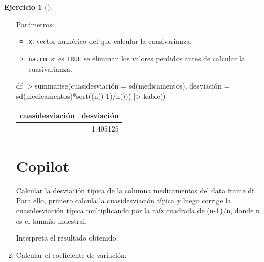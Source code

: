 \documentclass[
  a4paper,
]{scrreport}
\newenvironment{Shaded}{\begin{snugshade}}{\end{snugshade}}
\newcommand{\DecValTok}[1]{\textcolor[rgb]{0.68,0.00,0.00}{#1}}
\newcommand{\ErrorTok}[1]{\textcolor[rgb]{0.68,0.00,0.00}{#1}}
\newcommand{\ExtensionTok}[1]{\textcolor[rgb]{0.00,0.23,0.31}{#1}}
\newcommand{\FunctionTok}[1]{\textcolor[rgb]{0.28,0.35,0.67}{#1}}
\newcommand{\KeywordTok}[1]{\textcolor[rgb]{0.00,0.23,0.31}{\textbf{#1}}}
\newcommand{\NormalTok}[1]{\textcolor[rgb]{0.00,0.23,0.31}{#1}}
\newcommand{\OtherTok}[1]{\textcolor[rgb]{0.00,0.23,0.31}{#1}}
\newcommand{\SpecialCharTok}[1]{\textcolor[rgb]{0.37,0.37,0.37}{#1}}
\providecommand{\tightlist}{%
  \setlength{\itemsep}{0pt}\setlength{\parskip}{0pt}}\usepackage{longtable,booktabs,array}
\theoremstyle{definition}
\newtheorem{exercise}{Ejercicio}[chapter]
\theoremstyle{remark}
\begin{document}
\begin{exercise}[]
\begin{enumerate}
\begin{tcolorbox}
  Parámetros:

  \begin{itemize}
  \tightlist
  \item
    \texttt{x}: vector numérico del que calcular la cuasivarianza.
  \item
    \texttt{na.rm}: si es \texttt{TRUE} se eliminan los valores perdidos
    antes de calcular la cuasivarianza.
  \end{itemize}

\begin{Shaded}
\begin{Highlighting}[]
\NormalTok{df }\SpecialCharTok{|\textgreater{}} \FunctionTok{summarise}\NormalTok{(cuasidesviación }\OtherTok{=} \FunctionTok{sd}\NormalTok{(medicamentos), }
\NormalTok{    desviación }\OtherTok{=} \FunctionTok{sd}\NormalTok{(medicamentos)}\SpecialCharTok{*}\FunctionTok{sqrt}\NormalTok{((}\FunctionTok{n}\NormalTok{()}\SpecialCharTok{{-}}\DecValTok{1}\NormalTok{)}\SpecialCharTok{/}\FunctionTok{n}\NormalTok{())) }\SpecialCharTok{|\textgreater{}} 
    \FunctionTok{kable}\NormalTok{()}
\end{Highlighting}
\end{Shaded}

  \begin{longtable}[]{@{}rr@{}}
  \toprule\noalign{}
  cuasidesviación & desviación \\
  \midrule\noalign{}
  \endhead
  \bottomrule\noalign{}
  \endlastfoot
  1.423025 & 1.405125 \\
  \end{longtable}

  \section{Copilot}

\begin{Shaded}
\begin{Highlighting}[]
\ExtensionTok{Calcular}\NormalTok{ la desviación típica de la columna medicamentos del data frame df. Para ello, primero calcula la cuasidesviación típica y luego corrige la cuasidesviación típica multiplicando por la raíz cuadrada de }\ErrorTok{(}\ExtensionTok{n{-}1}\KeywordTok{)}\ExtensionTok{/n,}\NormalTok{ donde n es el tamaño muestral.}

\ExtensionTok{Interpreta}\NormalTok{ el resultado obtenido.}
\end{Highlighting}
\end{Shaded}

  \end{tcolorbox}
\item
  Calcular el coeficiente de variación.


\end{enumerate}
\end{exercise}
\end{document}
